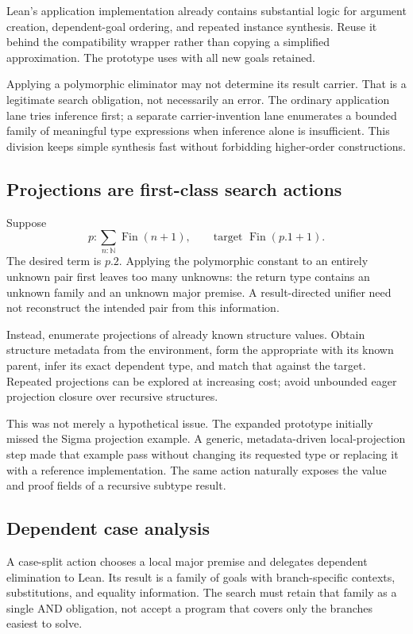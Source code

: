 \documentclass[11pt,letterpaper]{article}
\newcommand{\code}[1]{\texttt{\detokenize{#1}}}
\theoremstyle{definition}\newtheorem{definition}[theorem]{Definition}
\theoremstyle{remark}\newtheorem{remark}[theorem]{Remark}
\begin{document}
Lean's application implementation already contains substantial logic for argument
creation, dependent-goal ordering, and repeated instance synthesis. Reuse it
behind the compatibility wrapper rather than copying a simplified approximation.
The prototype uses \code{MVarId.apply} with all new goals retained.
\cite{applysource}

Applying a polymorphic eliminator may not determine its result carrier. That is
a legitimate search obligation, not necessarily an error. The ordinary
application lane tries inference first; a separate carrier-invention lane
enumerates a bounded family of meaningful type expressions when inference alone
is insufficient. This division keeps simple synthesis fast without forbidding
higher-order constructions.

\subsection{Projections are first-class search actions}

Suppose
\[
 p:\sum_{n:\mathbb N}\operatorname{Fin}(n+1),\qquad
 \text{target }\operatorname{Fin}(p.1+1).
\]
The desired term is $p.2$. Applying the polymorphic constant \code{Sigma.snd}
to an entirely unknown pair first leaves too many unknowns: the return type
contains an unknown family and an unknown major premise. A result-directed
unifier need not reconstruct the intended pair from this information.

Instead, enumerate projections of already known structure values. Obtain
structure metadata from the environment, form the appropriate \code{Expr.proj}
with its known parent, infer its exact dependent type, and match that against
the target. Repeated projections can be explored at increasing cost; avoid
unbounded eager projection closure over recursive structures.

This was not merely a hypothetical issue. The expanded prototype initially
missed the Sigma projection example. A generic, metadata-driven local-projection
step made that example pass without changing its requested type or replacing it
with a reference implementation. The same action naturally exposes the value
and proof fields of a recursive subtype result.

\subsection{Dependent case analysis}

A case-split action chooses a local major premise and delegates dependent
elimination to Lean. Its result is a family of goals with branch-specific
contexts, substitutions, and equality information. The search must retain that
family as a single AND obligation, not accept a program that covers only the
branches easiest to solve.
\end{document}

